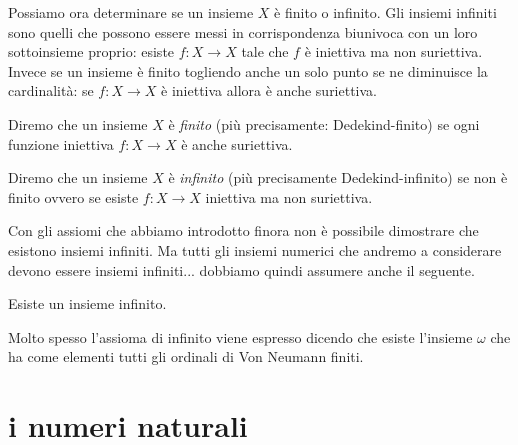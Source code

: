 Possiamo ora determinare se un insieme $X$ è finito o infinito.
Gli insiemi infiniti sono quelli che possono essere messi in corrispondenza 
biunivoca con un loro sottoinsieme proprio: esiste $f\colon X\to X$ 
tale che $f$ è iniettiva ma non suriettiva. 
Invece se un insieme è finito togliendo anche un solo punto
se ne diminuisce la cardinalità: se $f\colon X\to X$ è iniettiva
allora è anche suriettiva.

\begin{definition}[infinito]
  \label{def:infinito}%
  Diremo che un insieme $X$ è \emph{finito}
  (più precisamente: Dedekind-finito)
  se ogni funzione iniettiva $f\colon X\to X$ è anche suriettiva.
%

  Diremo che un insieme $X$ è \emph{infinito} 
  (più precisamente Dedekind-infinito)
  se non è finito ovvero
  se esiste $f\colon X\to X$ iniettiva ma non suriettiva.
%
\end{definition}

Con gli assiomi che abbiamo introdotto finora non è possibile dimostrare 
che esistono insiemi infiniti. 
Ma tutti gli insiemi numerici che andremo a considerare devono essere 
insiemi infiniti... dobbiamo quindi assumere anche il seguente. 

\begin{axiom}[infinito]
  \label{axiom:infinito}%
  Esiste un insieme infinito. 
\end{axiom}

Molto spesso l'assioma di infinito viene espresso dicendo che esiste 
l'insieme $\omega$ che ha come elementi tutti gli 
ordinali di Von Neumann finiti.
%
%

\section{i numeri naturali}

